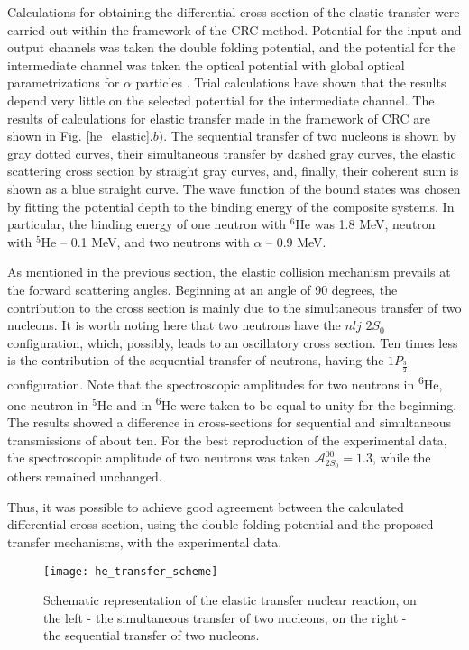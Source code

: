 \documentclass[
12pt, %
oneside, %
english, %
onehalfspacing, %
onehalfspacing, %
headsepline, %
]{MastersDoctoralThesis} %
\newcommand{\he}{\textsuperscript{6}He\xspace}
\begin{document}
Calculations for obtaining the differential cross section of the elastic transfer were carried out within the framework of the CRC method. Potential for the input and output channels was taken the double folding potential, and the potential for the intermediate channel was taken the optical potential with global optical parametrizations for $\alpha$ particles \cite{avrigeanu1994global}. Trial calculations have shown that the results depend very little on the selected potential for the intermediate channel.
The results of calculations for elastic transfer made in the framework of CRC are shown in Fig. \ref{he_elastic}.$b)$. 
The sequential transfer of two nucleons is shown by gray dotted curves, their simultaneous transfer by dashed gray curves, the elastic scattering cross section by straight gray curves, and, finally, their coherent sum is shown as a blue straight curve. 
The wave function of the bound states was chosen by fitting the potential depth to the binding energy of the composite systems. 
In particular, the binding energy of one neutron with $^6$He was 1.8 MeV,  neutron with $^5$He -- 0.1 MeV, and two neutrons with  $\alpha$  -- 0.9 MeV. 

As mentioned in the previous section, the elastic collision mechanism prevails at the forward scattering angles. Beginning at an angle of 90 degrees, the contribution to the cross section is mainly due to the simultaneous transfer of two nucleons. It is worth noting here that two neutrons have the $nlj$ $2S_0$ configuration, which, possibly, leads to an oscillatory cross section. Ten times less is the contribution of the sequential transfer of neutrons, having the $1P_{\frac{3}{2}}$ configuration. Note that the spectroscopic amplitudes for two neutrons in \he, one neutron in $^5$He and in \he were taken to be equal to unity for the beginning. The results showed a difference in cross-sections for sequential and simultaneous transmissions of about ten. For the best reproduction of the experimental data, the spectroscopic amplitude of two neutrons was taken  $\mathcal{A}^{00}_{2S_0}=1.3$, while the others remained unchanged.

Thus, it was possible to achieve good agreement between the calculated differential cross section, using the double-folding potential and the proposed transfer mechanisms, with the experimental data.

\begin{figure}
\centering
\texttt{[image: he\_transfer\_scheme]}
\decoRule
\caption{  \footnotesize  Schematic representation of the elastic transfer nuclear reaction, on the left - the simultaneous transfer of two nucleons, on the right - the sequential transfer of two nucleons.
}
\label{he_transfer_scheme}
\end{figure}
\end{document}

